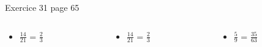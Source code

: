 \documentclass[xcolor={dvipsnames}, handout]{beamer}
\begin{document}
\begin{frame}
	
	\begin{block}{Exercice 31 page 65}
		
	\begin{columns}
		\begin{column}{0.25\textwidth}
			\begin{huge}
				\begin{itemize}
					\item $\frac{14}{21}$ = \pause $\frac{2}{3}$ \pause
					
					
					
					
				\end{itemize}	
			\end{huge}
			
		\end{column}
		
		\begin{column}{0.25\textwidth}
			\begin{huge}
				\begin{itemize}
					
					\item $\frac{14}{21}$ = \pause $\frac{2}{3}$ \pause
					
					
					
					
				\end{itemize}	
			\end{huge}
			
		\end{column}
	
		\begin{column}{0.25\textwidth}
			\begin{huge}
				\begin{itemize}
					\item $\frac{5}{9}$ = \pause $\frac{35}{63}$\pause
					
				\end{itemize}	
			\end{huge}
			
		\end{column}
	

\end{columns}
\end{block}
\end{frame}
\end{document}
